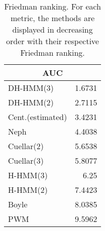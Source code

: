 \documentclass[landscape, 8pt]{report}
\begin{document}
\begin{table}[h!]
\label{tab:ranking}
\vspace{0.0cm}
\begin{center}
\caption{Friedman ranking. For each metric, the methods are displayed in decreasing order with their respective Friedman ranking.}
\renewcommand{\arraystretch}{1.2}
  \begin{tabular}{ |lr| }
    \hline
    \multicolumn{2}{|c|}{\textbf{AUC}} \\
    \hline
    DH-HMM(3) & 1.6731 \\
    DH-HMM(2) & 2.7115 \\
    Cent.(estimated) & 3.4231 \\
    Neph & 4.4038 \\
    Cuellar(2) & 5.6538 \\
    Cuellar(3) & 5.8077 \\
    H-HMM(3) & 6.25 \\
    H-HMM(2) & 7.4423 \\
    Boyle & 8.0385 \\
    PWM & 9.5962 \\
    \hline
  \end{tabular}
\end{center}
\vspace{0.0cm}
\end{table}
\end{document}

